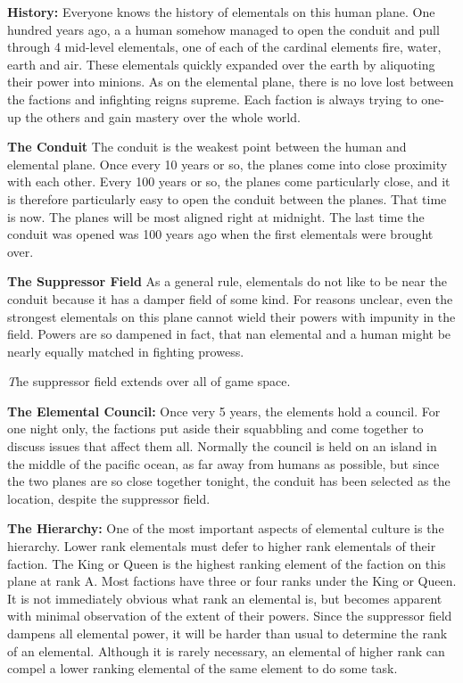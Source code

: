 \documentclass[blue]{elementals}
\begin{document}
\name{\bTest{}}

{\bf History:}
Everyone knows the history of elementals on this human plane. One hundred years ago, a a human somehow managed to open the conduit and pull through 4 mid-level elementals, one of each of the cardinal elements fire, water, earth and air. These elementals quickly expanded over the earth by aliquoting their power into minions. As on the elemental plane, there is no love lost between the factions and infighting reigns supreme. Each faction is always trying to one-up the others and gain mastery over the whole world.

{\bf The Conduit}
The conduit is the weakest point between the human and elemental plane. Once every 10 years or so, the planes come into close proximity with each other. Every 100 years or so, the planes come particularly close, and it is therefore particularly easy to open the conduit between the planes. That time is now. The planes will be most aligned right at midnight. The last time the conduit was opened was 100 years ago when the first elementals were brought over.

{\bf The Suppressor Field}
As a general rule, elementals do not like to be near the conduit because it has a damper field of some kind. For reasons unclear, even the strongest elementals on this plane cannot wield their powers with impunity in the field. Powers are so dampened in fact, that nan elemental and a human might be nearly equally matched in fighting prowess.

{\emph The suppressor field extends over all of game space.}

{\bf The Elemental Council:}
Once very 5 years, the elements hold a council. For one night only, the factions put aside their squabbling and come together to discuss issues that affect them all. Normally the council is held on an island in the middle of the pacific ocean, as far away from humans as possible, but since the two planes are so close together tonight, the conduit has been selected as the location, despite the suppressor field.

{\bf The Hierarchy:}
One of the most important aspects of elemental culture is the hierarchy. Lower rank elementals must defer to higher rank elementals of their faction. The King or Queen is the highest ranking element of the faction on this plane at rank A. Most factions have three or four ranks under the King or Queen. It is not immediately obvious what rank an elemental is, but becomes apparent with minimal observation of the extent of their powers. Since the suppressor field dampens all elemental power, it will be harder than usual to determine the rank of an elemental. Although it is rarely necessary, an elemental of higher rank can compel a lower ranking elemental of the same element to do some task.
\end{document}
